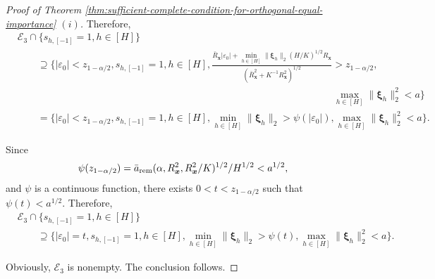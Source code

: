 \documentclass[12pt]{article}
\newcommand{\rem}{\textnormal{rem}}
\newcommand{\bs}{\boldsymbol}
\begin{document}
\begin{proof}[Proof of Theorem \ref{thm:sufficient-complete-condition-for-orthogonal-equal-importance} $(i)$]
Therefore,
\begin{align*}
    & \mathcal{E}_3 \cap \{s_{h,[-1]}=1, h \in [H]\} \\
    & \qquad \supseteq   \Big\{|\varepsilon_0| < z_{1-\alpha/2},s_{h, [-1]}=1, h\in [H], \frac{\bar{R}_{\bs{x}}|\varepsilon_0|+\min_{h\in [H]} \|\bs{\xi}_h\|_2(H/K)^{1/2}R_{\bs{x}}}{(\bar{R}_{\bs{x}}^2 + K^{-1}R^2_{\bs{x}})^{1/2}} > z_{1-\alpha/2},\\
    & \qquad \qquad \qquad\qquad\qquad\qquad\qquad\qquad\qquad\qquad\qquad\qquad\qquad \qquad\qquad\qquad \max_{h\in [H]} \|\bs{\xi}_h\|_2^2 < a \Big\}\\
    & \qquad = \Big\{|\varepsilon_0| < z_{1-\alpha/2},s_{h, [-1]}=1, h\in [H], \min_{h\in [H]} \|\bs{\xi}_h\|_2 >  \psi(|\varepsilon_0|), \max_{h\in [H]} \|\bs{\xi}_h\|_2^2 < a \Big\} .
\end{align*}

Since
\begin{align*} 
    \psi(z_{1-\alpha/2})= \bar{a}_{\rem}(\alpha,R^2_{\bs{x}},R^2_{\bs{x}}/K)^{1/2}/H^{1/2}  < a^{1/2},
\end{align*}
and $\psi$ is a continuous function, there exists $0 < t < z_{1-\alpha/2}$ such that $\psi(t) < a^{1/2}$. Therefore, 
\begin{align*}
    & \mathcal{E}_3 \cap \{s_{h,[-1]}=1, h \in [H]\} \\
    & \qquad \supseteq \Big\{|\varepsilon_0| = t ,s_{h, [-1]}=1, h\in [H], \min_{h\in [H]} \|\bs{\xi}_h\|_2 >  \psi(t), \max_{h\in [H]} \|\bs{\xi}_h\|_2^2 < a \Big\}.
\end{align*}

Obviously, $\mathcal{E}_3$ is  nonempty. The conclusion follows.
\end{proof}
\end{document}
